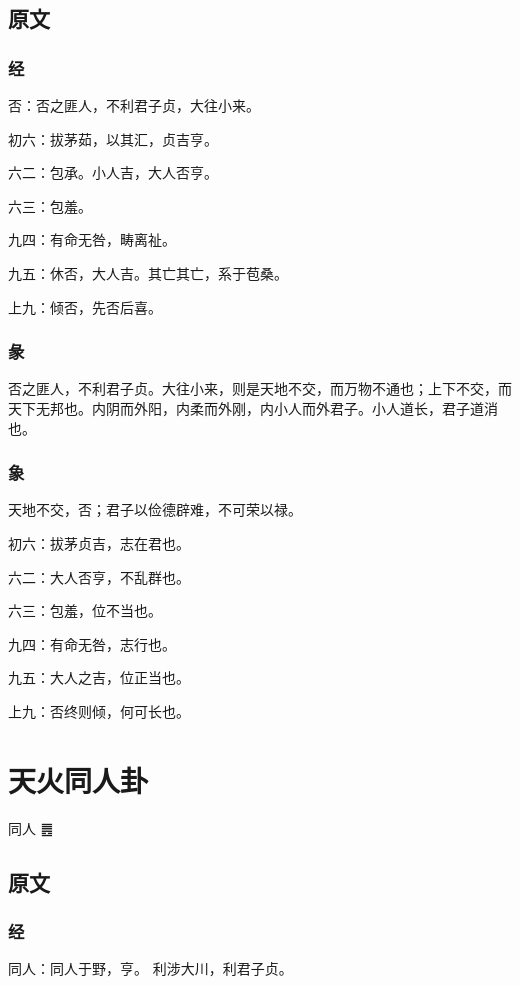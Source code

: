 \documentclass[12pt,oneside]{book}
\begin{document}
\section{原文}

\subsection{经}
否：否之匪人，不利君子贞，大往小来。

初六：拔茅茹，以其汇，贞吉亨。

六二：包承。小人吉，大人否亨。

六三：包羞。

九四：有命无咎，畴离祉。

九五：休否，大人吉。其亡其亡，系于苞桑。

上九：倾否，先否后喜。

\subsection{彖}
否之匪人，不利君子贞。大往小来，则是天地不交，而万物不通也；上下不交，而天下无邦也。内阴而外阳，内柔而外刚，内小人而外君子。小人道长，君子道消也。

\subsection{象}
天地不交，否；君子以俭德辟难，不可荣以禄。

初六：拔茅贞吉，志在君也。

六二：大人否亨，不乱群也。

六三：包羞，位不当也。

九四：有命无咎，志行也。

九五：大人之吉，位正当也。

上九：否终则倾，何可长也。


\chapter{天火同人卦}
同人 {\Large ䷌}

\section{原文}

\subsection{经}
同人：同人于野，亨。 利涉大川，利君子贞。
\end{document}
